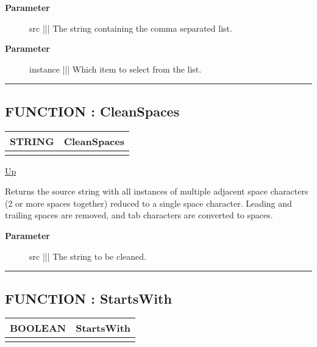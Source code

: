 \par
\begin{description}
\item [\textbf{Parameter}] src ||| The string containing the comma separated list.
\item [\textbf{Parameter}] instance ||| Which item to select from the list.
\end{description}

\rule{\textwidth}{0.4pt}
\subsection*{FUNCTION : CleanSpaces}
\hypertarget{ecldoc:str.cleanspaces}{}

{\renewcommand{\arraystretch}{1.5}
\begin{tabularx}{\textwidth}{|>{\raggedright\arraybackslash}l|X|}
\hline
\hspace{0pt}STRING & CleanSpaces \\
\hline
\multicolumn{2}{|>{\raggedright\arraybackslash}X|}{\hspace{0pt}(STRING src)} \\
\hline
\end{tabularx}
}

\hyperlink{ecldoc:Str}{Up}

\par
Returns the source string with all instances of multiple adjacent space characters (2 or more spaces together) reduced to a single space character. Leading and trailing spaces are removed, and tab characters are converted to spaces.

\par
\begin{description}
\item [\textbf{Parameter}] src ||| The string to be cleaned.
\end{description}

\rule{\textwidth}{0.4pt}
\subsection*{FUNCTION : StartsWith}
\hypertarget{ecldoc:str.startswith}{}

{\renewcommand{\arraystretch}{1.5}
\begin{tabularx}{\textwidth}{|>{\raggedright\arraybackslash}l|X|}
\hline
\hspace{0pt}BOOLEAN & StartsWith \\
\hline
\multicolumn{2}{|>{\raggedright\arraybackslash}X|}{\hspace{0pt}(STRING src, STRING prefix)} \\
\hline
\end{tabularx}
}

